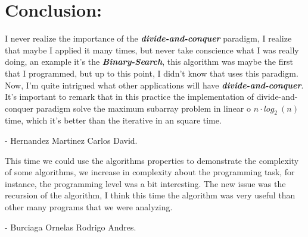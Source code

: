 \section{Conclusion:}

I never realize the importance of the {\bfseries\itshape divide-and-conquer} paradigm, I realize that maybe I applied it many times, but never take conscience what I was really doing, an example it's the {\bfseries\itshape Binary-Search}, this algorithm was maybe the first that I programmed, but up to this point, I didn't know that uses this paradigm. Now, I'm quite intrigued what other applications will have {\bfseries\itshape divide-and-conquer}. It's important to remark that in this practice the implementation of divide-and-conquer paradigm solve the maximum subarray problem in linear o $n \cdot log_{2}\ (n)$ time, which it's better than the iterative in an square time.

\begin{flushright}
- Hernandez Martinez Carlos David.
\end{flushright} \hfill \break

This time we could use the algorithms properties to demonstrate the complexity of some algorithms, we increase in complexity about the programming task, for instance, the programming level was a bit interesting. The new issue was the recursion of the algorithm, I think this time the algorithm was very useful than other many programs that we were analyzing.

\begin{flushright}
- Burciaga Ornelas Rodrigo Andres.
\end{flushright} 

\pagebreak